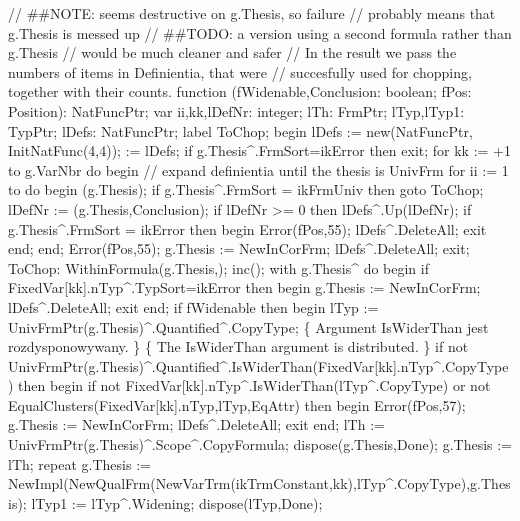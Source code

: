 // ##NOTE: seems destructive on g.Thesis, so failure
//         probably means that g.Thesis is messed up
// ##TODO: a version using a second formula rather than g.Thesis
//         would be much cleaner and safer
// In the result we pass the numbers of items in Definientia, that were
// succesfully used for chopping, together with their counts.
function (fWidenable,Conclusion: boolean;
                  fPos: Position): NatFuncPtr;
var
   ii,kk,lDefNr: integer;
   lTh: FrmPtr;
   lTyp,lTyp1: TypPtr;
   lDefs: NatFuncPtr;
label ToChop;
begin
   lDefs := new(NatFuncPtr, InitNatFunc(4,4));
    := lDefs;
   if g.Thesis^.FrmSort=ikError then exit;
   for kk := +1 to g.VarNbr do
   begin
      // expand definientia until the thesis is UnivFrm
      for ii := 1 to  do
      begin
         (g.Thesis);
         if g.Thesis^.FrmSort = ikFrmUniv then goto ToChop;
         lDefNr := (g.Thesis,Conclusion);
         if lDefNr >= 0 then lDefs^.Up(lDefNr);
         if g.Thesis^.FrmSort = ikError then
         begin Error(fPos,55); lDefs^.DeleteAll; exit end;
      end;
      Error(fPos,55); g.Thesis := NewInCorFrm; lDefs^.DeleteAll; exit;
      ToChop:
         WithinFormula(g.Thesis,); inc();
         with g.Thesis^ do
      begin
         if FixedVar[kk].nTyp^.TypSort=ikError then
         begin g.Thesis := NewInCorFrm; lDefs^.DeleteAll; exit end;
         if fWidenable then
         begin lTyp := UnivFrmPtr(g.Thesis)^.Quantified^.CopyType;
         \{ Argument IsWiderThan jest rozdysponowywany. \}
         \{ The IsWiderThan argument is distributed. \}
         if not UnivFrmPtr(g.Thesis)^.Quantified^.IsWiderThan(FixedVar[kk].nTyp^.CopyType) then
         begin
            if not FixedVar[kk].nTyp^.IsWiderThan(lTyp^.CopyType)
               or not EqualClusters(FixedVar[kk].nTyp,lTyp,EqAttr) then
            begin Error(fPos,57); g.Thesis := NewInCorFrm; lDefs^.DeleteAll; exit end;
            lTh := UnivFrmPtr(g.Thesis)^.Scope^.CopyFormula;
            dispose(g.Thesis,Done);
            g.Thesis := lTh;
            repeat
               g.Thesis := 
                  NewImpl(NewQualFrm(NewVarTrm(ikTrmConstant,kk),lTyp^.CopyType),g.Thesis);
               lTyp1 := lTyp^.Widening;
               dispose(lTyp,Done);
